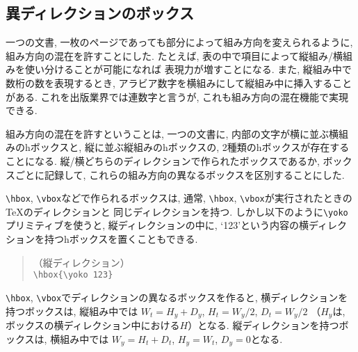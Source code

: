\subsection{異ディレクションのボックス}

一つの文書, 一枚のページであっても部分によって組み方向を変えられるように,
組み方向の混在を許すことにした.
たとえば, 表の中で項目によって縦組み/横組みを使い分けることが可能になれば
表現力が増すことになる.
また, 縦組み中で数桁の数を表現するとき,
アラビア数字を横組みにして縦組み中に挿入することがある.
これを出版業界では連数字と言うが, これも組み方向の混在機能で実現できる.

組み方向の混在を許すということは, 一つの文書に,
内部の文字が横に並ぶ横組みのhボックスと,
縦に並ぶ縦組みのhボックスの, 2種類のhボックスが存在することになる.
縦/横どちらのディレクションで作られたボックスであるか, ボックスごとに記録して,
これらの組み方向の異なるボックスを区別することにした.

\verb|\hbox|, \verb|\vbox|などで作られるボックスは, 通常,
\verb|\hbox|, \verb|\vbox|が実行されたときの\TeX のディレクションと
同じディレクションを持つ.
しかし以下のように\verb|\yoko|プリミティブを使うと,
縦ディレクションの中に,
`123'という内容の横ディレクションを持つhボックスを置くこともできる.
\begin{quote}
	（縦ディレクション）\\
	\verb|\hbox{\yoko 123}|
\end{quote}

\verb|\hbox|, \verb|\vbox|でディレクションの異なるボックスを作ると,
横ディレクションを持つボックスは, 縦組み中では
$W_t=H_y+D_y$, $H_t=W_y/2$, $D_t=W_y/2$
（$H_y$は, ボックスの横ディレクション中における$H$）となる.
縦ディレクションを持つボックスは, 横組み中では
$W_y=H_t+D_t$, $H_y=W_t$, $D_y=0$となる.

